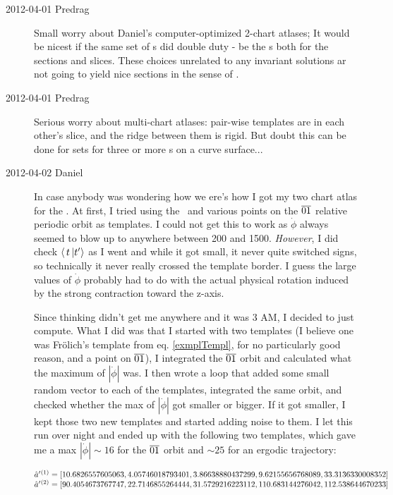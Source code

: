 \begin{description}
\item[2012-04-01 Predrag] Small worry about Daniel's computer-optimized
2-chart atlases; It would be nicest if the same set of {\template s} did
double duty - be the {\template s} both for the sections and slices.
These choices unrelated to any invariant solutions ar not going to yield
nice sections in the sense of .

\item[2012-04-01 Predrag] Serious worry about multi-chart atlases:
pair-wise templates are in each other's slice, and the ridge between them
is rigid. But doubt this can be done for sets for three or more
{\template s} on a curve surface...

\item[2012-04-02 Daniel]
In case anybody was wondering how we
ere's how I got my two chart atlas for the
\cLe. At first, I tried using the
\reqv\ and various points on the $\overline{01}$ relative
periodic orbit as templates. I could not get this to work as $\dot{\phi}$
always seemed to blow up to anywhere between 200 and 1500.
\emph{However}, I did check $\braket{\,t\,}{\sliceTan{}{}}$ as I went and
while it got small, it never quite switched signs, so technically it
never really crossed the template border. I guess the large values of
$\dot{\phi}$ probably had to do with the actual physical rotation induced
by the strong contraction toward the z-axis.

Since thinking didn't get me anywhere and it was 3 AM, I decided to just
compute. What I did was that I started with two templates (I believe one
was Fr\"olich's template from eq. \ref{exmplTempl}, for no particularly
good reason, and a point on $\overline{01}$), I integrated the
$\overline{01}$ orbit and calculated what the maximum of $|\dot{\phi}|$
was. I then wrote a loop that added some small random vector to each of
the templates, integrated the same orbit, and checked whether the max of
$|\dot{\phi}|$ got smaller or bigger. If it got smaller, I kept those two
new templates and started adding noise to them. I let this run over night
and ended up with the following two templates, which gave me a max
$|\dot{\phi}| \sim 16$ for the $\overline{01}$ orbit and $\sim 25$ for an
ergodic trajectory:

$\hat{a}'{}^{(1)} = [10.6826557605063, 4.05746018793401, 3.86638880437299, 9.62155656768089, 33.3136330008352]$ \\

$\hat{a}'{}^{(2)} = [90.4054673767747, 22.7146855264444, 31.5729216223112, 110.683144276042, 112.538644670233]$\\


\end{description}

